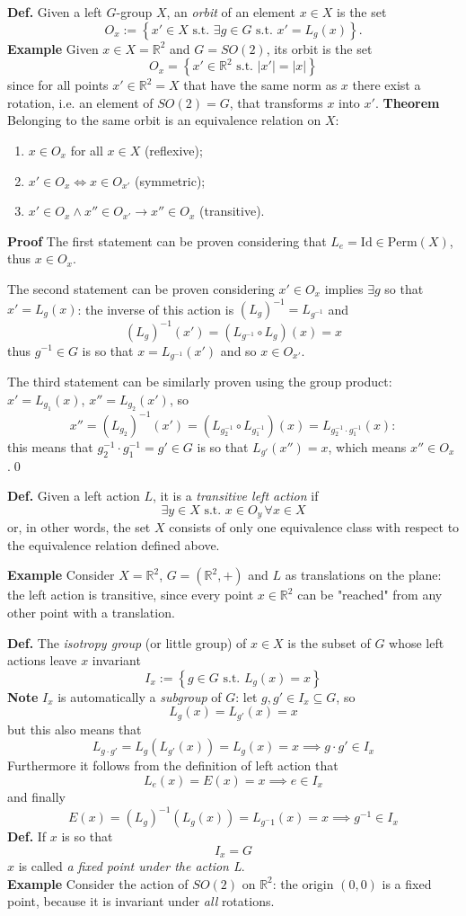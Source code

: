 \textbf{Def.} Given a left $G$-group $X$, an \textit{orbit} of an element $x\in X$ is
the set
$$O_x:=\left\{x'\in X\text{ s.t. }\exists g\in G \text{ s.t. }x' = L_g(x)\right\}.$$
\textbf{Example} Given $x\in X=\mathbb{R}^2$ and $G=SO(2)$, its orbit is the set
$$O_x = \left\{x'\in\mathbb{R}^2\text{ s.t. }|x'| = |x|\right\}$$
since for all points $x'\in\mathbb{R}^2=X$ that have the same norm as $x$ there
exist a rotation, i.e. an element of $SO(2)=G$, that transforms $x$ into $x'$.
\newpage
\textbf{Theorem} Belonging to the same orbit is an equivalence relation on $X$:
\begin{enumerate}
    \item $x\in O_x$ for all $x\in X$ (reflexive);
    \item $x'\in O_x \iff x\in O_{x'}$ (symmetric);
    \item $x'\in O_x\land x''\in O_{x'} \rightarrow x''\in O_x$ (transitive). 
\end{enumerate}
\textbf{Proof}
The first statement can be proven considering that
$L_e = \text{Id}\in\text{Perm}(X)$, thus $x\in O_x$.

The second statement can be proven considering $x'\in O_x$ implies $\exists g$ so
that $x' = L_g(x)$: the inverse of this action is
$\left(L_g\right)^{-1} = L_{g^{-1}}$ and
$$(L_{g})^{-1}(x') = (L_{g^{-1}}\circ L_g)(x) = x$$
thus $g^{-1}\in G$ is so that $x=L_{g^{-1}}(x')$ and so $x\in O_{x'}$.

The third statement can be similarly proven using the group product: $x'=L_{g_1}(x)$,
$x'' = L_{g_2}(x')$, so
$$x'' = (L_{g_2})^{-1}(x') = (L_{g_2^{-1}}\circ L_{g_1^{-1}})(x) = L_{g_2^{-1}\cdot
g_1^{-1}}(x):$$
this means that $g_2^{-1}\cdot g_1^{-1}=g'\in G$ is so that $L_{g'}(x'') = x$, which
means $x''\in O_x$.\qed

\textbf{Def.} Given a left action $L$, it is a \textit{transitive left action} if
$$\exists y\in X\text{ s.t. } x\in O_y\,\forall x\in X$$
or, in other words, the set $X$ consists of only one equivalence class with respect
to the equivalence relation defined above.

\textbf{Example} Consider $X = \mathbb{R}^2$, $G = (\mathbb{R}^2,+)$ and $L$ as
translations on the plane: the left action is transitive, since every point $x\in
\mathbb{R}^2$ can be "reached" from any other point with a translation.

\textbf{Def.} The \textit{isotropy group} (or little group) of $x\in X$ is
the subset of $G$ whose left actions leave $x$ invariant
$$I_x:=\left\{g\in G\text{ s.t. }L_g(x)=x\right\}$$
\textbf{Note} $I_x$ is automatically a \textit{subgroup} of $G$: let
$g,g'\in I_x\subseteq G$, so
$$L_{g}(x)=L_{g'}(x)=x$$
but this also means that
$$L_{g\cdot g'} = L_g(L_{g'}(x)) = L_g(x)=x \implies g\cdot g'\in I_x$$
Furthermore it follows from the definition of left action that
$$L_e(x)=E(x)=x\implies e\in I_x$$
and finally
$$E(x) = (L_g)^{-1}(L_g(x)) = L_{g^-1}(x) = x\implies g^{-1}\in I_x$$
\textbf{Def.} If $x$ is so that
$$I_x = G$$
$x$ is called \textit{a fixed point under the action L}.\\
\textbf{Example} Consider the action of $SO(2)$ on $\mathbb{R}^2$: the origin
$(0,0)$ is a fixed point, because it is invariant under \textit{all} rotations.
